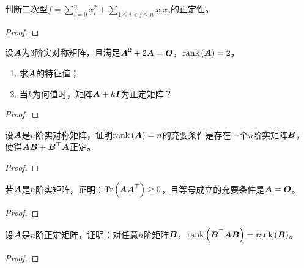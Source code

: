 \begin{problem}
判断二次型\(f=\sum_{i=0}^nx_i^2+\sum_{1\le i<j\le n}x_ix_j\)的正定性。
\end{problem}
\begin{proof}

\end{proof}

\begin{problem}
设\(\boldsymbol{A}\)为\(3\)阶实对称矩阵，且满足\(\boldsymbol{A}^2+2\boldsymbol{A}=\boldsymbol{O}\)，\(\mathrm{rank}\left( \boldsymbol{A} \right)=2\)，
\begin{enumerate}
    \item 求\(\boldsymbol{A}\)的特征值；
    \item 当\(k\)为何值时，矩阵\(\boldsymbol{A}+k\boldsymbol{I}\)为正定矩阵？
\end{enumerate}
\end{problem}
\begin{proof}

\end{proof}

\begin{problem}
设\(\boldsymbol{A}\)是\(n\)阶实对称矩阵，证明\(\mathrm{rank}\left( \boldsymbol{A} \right)=n\)的充要条件是存在一个\(n\)阶实矩阵\(\boldsymbol{B}\)，使得\(\boldsymbol{A}\boldsymbol{B}+\boldsymbol{B}^\top\boldsymbol{A}\)正定。
\end{problem}
\begin{proof}

\end{proof}

\begin{problem}
若\(\boldsymbol{A}\)是\(n\)阶实矩阵，证明：\(\mathrm{Tr}\left( \boldsymbol{A}\boldsymbol{A}^\top \right)\ge0\)，且等号成立的充要条件是\(\boldsymbol{A}=\boldsymbol{O}\)。
\end{problem}
\begin{proof}

\end{proof}

\begin{problem}
设\(\boldsymbol{A}\)是\(n\)阶正定矩阵，证明：对任意\(n\)阶矩阵\(\boldsymbol{B}\)，\(\mathrm{rank}\left( \boldsymbol{B}^\top\boldsymbol{A}\boldsymbol{B} \right)=\mathrm{rank}\left( \boldsymbol{B} \right)\)。
\end{problem}
\begin{proof}

\end{proof}